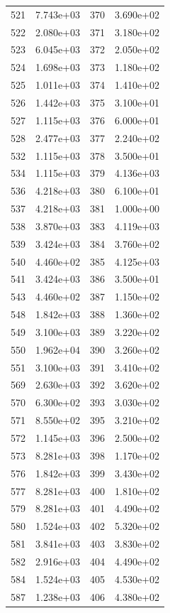 \documentclass[12pt]{article}
\begin{document}
\begin{longtable}{@{}cccc@{}}
521 & 7.743e+03 & 370 & 3.690e+02 \\
522 & 2.080e+03 & 371 & 3.180e+02 \\
523 & 6.045e+03 & 372 & 2.050e+02 \\
524 & 1.698e+03 & 373 & 1.180e+02 \\
525 & 1.011e+03 & 374 & 1.410e+02 \\
526 & 1.442e+03 & 375 & 3.100e+01 \\
527 & 1.115e+03 & 376 & 6.000e+01 \\
528 & 2.477e+03 & 377 & 2.240e+02 \\
532 & 1.115e+03 & 378 & 3.500e+01 \\
534 & 1.115e+03 & 379 & 4.136e+03 \\
536 & 4.218e+03 & 380 & 6.100e+01 \\
537 & 4.218e+03 & 381 & 1.000e+00 \\
538 & 3.870e+03 & 383 & 4.119e+03 \\
539 & 3.424e+03 & 384 & 3.760e+02 \\
540 & 4.460e+02 & 385 & 4.125e+03 \\
541 & 3.424e+03 & 386 & 3.500e+01 \\
543 & 4.460e+02 & 387 & 1.150e+02 \\
548 & 1.842e+03 & 388 & 1.360e+02 \\
549 & 3.100e+03 & 389 & 3.220e+02 \\
550 & 1.962e+04 & 390 & 3.260e+02 \\
551 & 3.100e+03 & 391 & 3.410e+02 \\
569 & 2.630e+03 & 392 & 3.620e+02 \\
570 & 6.300e+02 & 393 & 3.030e+02 \\
571 & 8.550e+02 & 395 & 3.210e+02 \\
572 & 1.145e+03 & 396 & 2.500e+02 \\
573 & 8.281e+03 & 398 & 1.170e+02 \\
576 & 1.842e+03 & 399 & 3.430e+02 \\
577 & 8.281e+03 & 400 & 1.810e+02 \\
579 & 8.281e+03 & 401 & 4.490e+02 \\
580 & 1.524e+03 & 402 & 5.320e+02 \\
581 & 3.841e+03 & 403 & 3.830e+02 \\
582 & 2.916e+03 & 404 & 4.490e+02 \\
584 & 1.524e+03 & 405 & 4.530e+02 \\
587 & 1.238e+03 & 406 & 4.380e+02 \\

\end{longtable}
\end{document}
